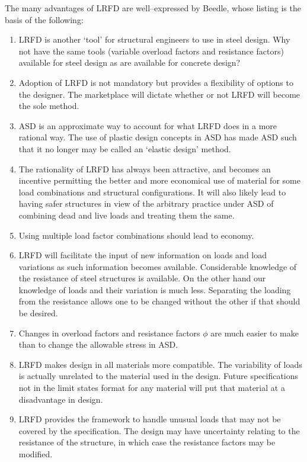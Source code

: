 The many advantages of LRFD are well--expressed by Beedle, whose listing is the basis of the following:
\begin{mdframed}[style=highlight]
\begin{enumerate}
\item LRFD is another `tool' for structural engineers to use in steel design.
Why not have the same tools (variable overload factors and resistance factors) available for steel design as are available for concrete design?
\item Adoption of LRFD is not mandatory but provides a flexibility of options to the designer.
The marketplace will dictate whether or not LRFD will become the sole method.
\item ASD is an approximate way to account for what LRFD does in a more rational way.
The use of plastic design concepts in ASD has made ASD such that it no longer may be called an `elastic design' method.
\item The rationality of LRFD has always been attractive, and becomes an incentive permitting the better and more economical use of material for some load combinations and structural configurations.
It will also likely lead to having safer structures in view of the arbitrary practice under ASD of combining dead and live loads and treating them the same.
\item Using multiple load factor combinations should lead to economy.
\item LRFD will facilitate the input of new information on loads and load variations as such information becomes available.
Considerable knowledge of the resistance of steel structures is available.
On the other hand our knowledge of loads and their variation is much less.
Separating the loading from the resistance allows one to be changed without the other if that should be desired.
\item Changes in overload factors and resistance factors $\phi$ are much easier to make than to change the allowable stress in ASD.
\item LRFD makes design in all materials more compatible.
The variability of loads is actually unrelated to the material used in the design.
Future specifications not in the limit states format for any material will put that material at a disadvantage in design.
\item LRFD provides the framework to handle unusual loads that may not be covered by the specification.
The design may have uncertainty relating to the resistance of the structure, in which case the resistance factors may be modified.

\end{enumerate}
\end{mdframed}
